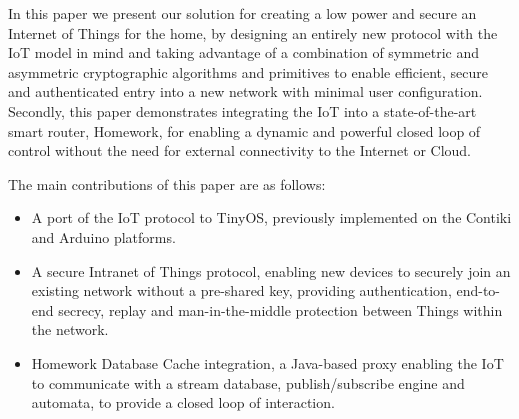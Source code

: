 \documentclass[conference]{./sty/IEEEtran}
\begin{document}
In this paper we present our solution for creating a low power and secure an Internet of Things for the home, by designing an entirely new protocol with the IoT model in mind and taking advantage of a combination of symmetric and asymmetric cryptographic algorithms and primitives to enable efficient, secure and authenticated entry into a new network with minimal user configuration. Secondly, this paper demonstrates integrating the IoT into a state-of-the-art smart router, Homework\cite{HomeworkProject}, for enabling a dynamic and powerful closed loop of control without the need for external connectivity to the Internet or Cloud. 


The main contributions of this paper are as follows:
\begin{itemize}
  \item A port of the IoT protocol to TinyOS, previously implemented on the Contiki and Arduino platforms.
  \item A secure Intranet of Things protocol, enabling new devices to securely join an existing network without a pre-shared key, providing authentication, end-to-end secrecy, replay and man-in-the-middle protection between Things within the network. 
  \item Homework Database Cache integration, a Java-based proxy enabling the IoT to communicate with a stream database, publish/subscribe engine and automata, to provide a closed loop of interaction.
\end{itemize}

\end{document}
